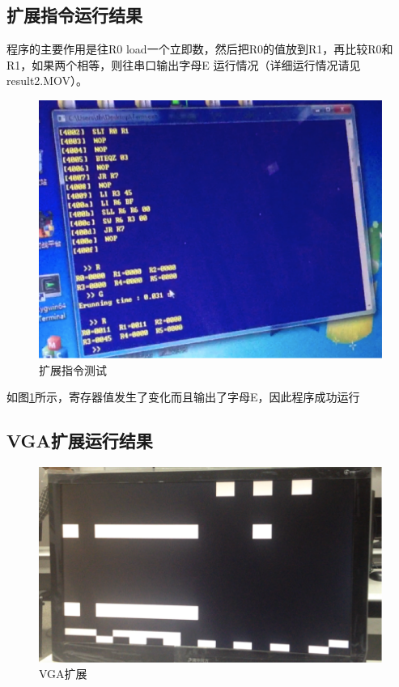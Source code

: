 \documentclass{article}
\begin{document}
\subsection{扩展指令运行结果}
程序的主要作用是往R0 load一个立即数，然后把R0的值放到R1，再比较R0和R1，如果两个相等，则往串口输出字母E
运行情况（详细运行情况请见result2.MOV）。

\begin{figure}[h]
\centering
\includegraphics[width=1.1\columnwidth]{test.png}
\caption{扩展指令测试}
\label{fig:test}
\end{figure}

如图\ref{fig:test}所示，寄存器值发生了变化而且输出了字母E，因此程序成功运行

\subsection{VGA扩展运行结果}
\begin{figure}[h]
\centering
\includegraphics[width=1.1\columnwidth]{vga.png}
\caption{VGA扩展}
\label{fig:vga}
\end{figure}
\end{document}
